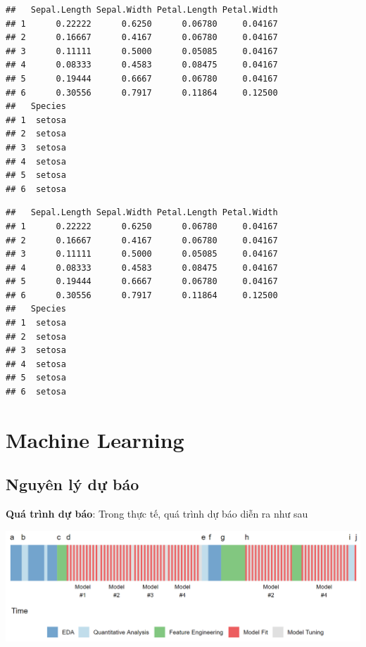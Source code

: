 \documentclass[]{krantz}
\makeatletter
\newenvironment{Shaded}{\begin{snugshade}}{\end{snugshade}}
\newcommand{\CommentTok}[1]{\textcolor[rgb]{0.37,0.37,0.37}{\textit{#1}}}
\newcommand{\KeywordTok}[1]{\textcolor[rgb]{0.27,0.27,0.27}{\textbf{#1}}}
\newcommand{\NormalTok}[1]{#1}
\newcommand{\OperatorTok}[1]{\textcolor[rgb]{0.43,0.43,0.43}{\textbf{#1}}}
\newcommand{\StringTok}[1]{\textcolor[rgb]{0.5,0.5,0.5}{#1}}
\newenvironment{kframe}{%
\medskip{}
\setlength{\fboxsep}{.8em}
 \def\at@end@of@kframe{}%
 \ifinner\ifhmode%
  \def\at@end@of@kframe{\end{minipage}}%
  \begin{minipage}{\columnwidth}%
 \fi\fi%
 \def\FrameCommand##1{\hskip\@totalleftmargin \hskip-\fboxsep
 \colorbox{shadecolor}{##1}\hskip-\fboxsep
     \hskip-\linewidth \hskip-\@totalleftmargin \hskip\columnwidth}%
 \MakeFramed {\advance\hsize-\width
   \@totalleftmargin\z@ \linewidth\hsize
   \@setminipage}}%
 {\par\unskip\endMakeFramed%
 \at@end@of@kframe}
\renewenvironment{Shaded}{\begin{kframe}}{\end{kframe}}
\renewenvironment{Shaded}{\begin{snugshade}}{\end{snugshade}}
\renewcommand{\CommentTok}[1]{\textcolor[rgb]{0.56,0.35,0.01}{\textit{#1}}}
\renewcommand{\KeywordTok}[1]{\textcolor[rgb]{0.13,0.29,0.53}{\textbf{#1}}}
\renewcommand{\NormalTok}[1]{#1}
\renewcommand{\OperatorTok}[1]{\textcolor[rgb]{0.81,0.36,0.00}{\textbf{#1}}}
\renewcommand{\StringTok}[1]{\textcolor[rgb]{0.31,0.60,0.02}{#1}}
\theoremstyle{definition}
\theoremstyle{definition}
\theoremstyle{definition}
\theoremstyle{remark}
\makeatother
\begin{document}
\begin{verbatim}
##   Sepal.Length Sepal.Width Petal.Length Petal.Width
## 1      0.22222      0.6250      0.06780     0.04167
## 2      0.16667      0.4167      0.06780     0.04167
## 3      0.11111      0.5000      0.05085     0.04167
## 4      0.08333      0.4583      0.08475     0.04167
## 5      0.19444      0.6667      0.06780     0.04167
## 6      0.30556      0.7917      0.11864     0.12500
##   Species
## 1  setosa
## 2  setosa
## 3  setosa
## 4  setosa
## 5  setosa
## 6  setosa
\end{verbatim}

\begin{Shaded}
\end{Shaded}

\begin{verbatim}
##   Sepal.Length Sepal.Width Petal.Length Petal.Width
## 1      0.22222      0.6250      0.06780     0.04167
## 2      0.16667      0.4167      0.06780     0.04167
## 3      0.11111      0.5000      0.05085     0.04167
## 4      0.08333      0.4583      0.08475     0.04167
## 5      0.19444      0.6667      0.06780     0.04167
## 6      0.30556      0.7917      0.11864     0.12500
##   Species
## 1  setosa
## 2  setosa
## 3  setosa
## 4  setosa
## 5  setosa
## 6  setosa
\end{verbatim}

\mainmatter

\hypertarget{part-machine-learning}{%
\part{Machine Learning}\label{part-machine-learning}}

\hypertarget{nguyen-ly-d-bao}{%
\chapter{Nguyên lý dự báo}\label{nguyen-ly-d-bao}}

\textbf{Quá trình dự báo}: Trong thực tế, quá trình dự báo diễn ra như
sau

\includegraphics{Images/modelling-process.png}
\end{document}
